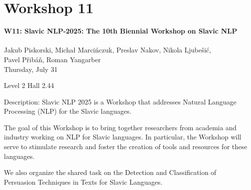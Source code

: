 \clearpage



\section[W11: Slavic NLP-2025: The 10th Biennial Workshop \\
on Slavic NLP]{Workshop 11}
\label{workshop_11}

\begin{center}
    {\Large \textbf{W11: Slavic NLP-2025: The 10th Biennial Workshop on Slavic NLP}}\\
    
\\

   Jakub Piskorski, Michał Marcińczuk, Preslav Nakov, Nikola Ljubešić, \\
   Pavel Přibáň, Roman Yangarber\\

    Thursday, July 31
    
   Level 2 Hall 2.44

\end{center}

Description: Slavic NLP 2025 is a Workshop that addresses Natural Language Processing (NLP) for the Slavic languages.

The goal of this Workshop is to bring together researchers from academia and industry working on NLP for Slavic languages. In particular, the Workshop will serve to stimulate research and foster the creation of tools and resources for these languages.

We also organize the shared task on the Detection and Classification of Persuasion Techniques in Texts for Slavic Languages.

